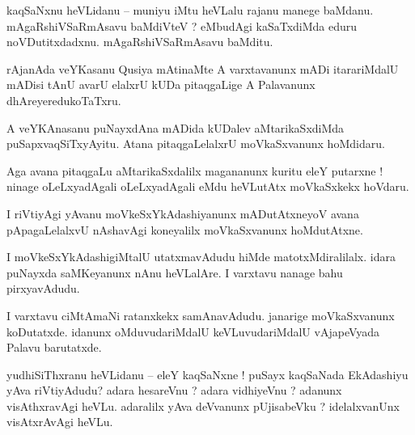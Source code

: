 \documentclass{article}
\begin{document}
\begin{mn}%
kaqSaNxnu heVLidanu -- muniyu iMtu heVLalu rajanu manege baMdanu. mAgaRshiVSaRmAsavu baMdiVteV ? 
eMbudAgi kaSaTxdiMda eduru noVDutitxdadxnu. mAgaRshiVSaRmAsavu baMditu.
\end{mn}

\begin{mn}%
rAjanAda veYKasanu Qusiya mAtinaMte A varxtavanunx mADi itarariMdalU mADisi tAnU avarU elalxrU kUDa 
pitaqgaLige A Palavanunx dhAreyeredukoTaTxru.
\end{mn}

\begin{mn}%
A veYKAnasanu puNayxdAna mADida kUDalev aMtarikaSxdiMda puSapxvaqSiTxyAyitu. Atana pitaqgaLelalxrU 
moVkaSxvanunx hoMdidaru.
\end{mn}

\begin{mn}%
Aga avana pitaqgaLu aMtarikaSxdalilx magananunx kuritu eleY putarxne ! ninage oLeLxyadAgali 
oLeLxyadAgali eMdu heVLutAtx moVkaSxkekx hoVdaru.
\end{mn}

\begin{mn}%
I riVtiyAgi yAvanu moVkeSxYkAdashiyanunx mADutAtxneyoV avana pApagaLelalxvU nAshavAgi koneyalilx 
moVkaSxvanunx hoMdutAtxne.
\end{mn}

\begin{mn}%
I moVkeSxYkAdashigiMtalU utatxmavAdudu hiMde matotxMdiralilalx. idara puNayxda saMKeyanunx nAnu 
heVLalAre. I varxtavu nanage bahu pirxyavAdudu.
\end{mn}

\begin{mn}%
I varxtavu ciMtAmaNi ratanxkekx samAnavAdudu. janarige moVkaSxvanunx koDutatxde. idanunx 
oMduvudariMdalU keVLuvudariMdalU vAjapeVyada Palavu barutatxde.
\end{mn}


\begin{mn}%
yudhiSiThxranu heVLidanu -- eleY kaqSaNxne ! puSayx kaqSaNada EkAdashiyu yAva riVtiyAdudu? adara 
hesareVnu ? adara vidhiyeVnu ? adanunx visAthxravAgi heVLu. adaralilx yAva deVvanunx pUjisabeVku ? 
idelalxvanUnx visAtxrAvAgi heVLu.
\end{mn}
\end{document}

